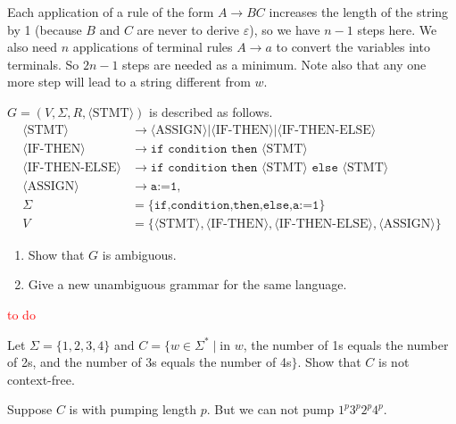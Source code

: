Each application of a rule of the form $A\to BC$ increases the length of the string by 1 (because $B$ and $C$ are never to derive $\varepsilon$), so we have $n-1$ steps here. We also need $n$ applications of terminal rules $A\to a$ to convert the variables into terminals. So $2n-1$ steps are needed as a minimum. Note also that any one more step will lead to a string different from $w$.

\begin{exercise}
  $G=(V,\Sigma,R,\langle \text{STMT}\rangle)$ is described as follows.
  \begin{align*}
    \langle \text{STMT}\rangle         & \rightarrow\langle \text{ASSIGN}\rangle|\langle \text{IF-THEN}\rangle|\langle \text{IF-THEN-ELSE}\rangle                  \\
    \langle \text{IF-THEN}\rangle      & \rightarrow \texttt{if condition then }\langle \text{STMT}\rangle                                                         \\
    \langle \text{IF-THEN-ELSE}\rangle & \rightarrow\texttt{if condition then }\langle \text{STMT}\rangle\texttt{ else }\langle \text{STMT}\rangle                 \\
    \langle \text{ASSIGN}\rangle       & \rightarrow\texttt{a:=1},                                                                                                 \\
    \Sigma                             & =\{\texttt{if,condition,then,else,a:=1}\}                                                                                 \\
    V                                  & =\{\langle\text{STMT}\rangle,\langle\text{IF-THEN}\rangle,\langle\text{IF-THEN-ELSE}\rangle,\langle\text{ASSIGN}\rangle\}
  \end{align*}
  \begin{enumerate}[label=(\alph*)]
    \item Show that $G$ is ambiguous.
    \item Give a new unambiguous grammar for the same language.\qedhere
  \end{enumerate}
\end{exercise}

\textcolor{red}{to do}

\setcounter{exercise}{31}

\begin{exercise}
  Let $\Sigma = \{1, 2, 3, 4\}$ and $C = \{ w \in \Sigma^* \mid \text{in } w$, the number of 1s equals the number of 2s, and the number of 3s equals the number of 4s$\}$. Show that $C$ is not context-free.
\end{exercise}

Suppose $C$ is with pumping length $p$. But we can not pump $1^p3^p2^p4^p$.

